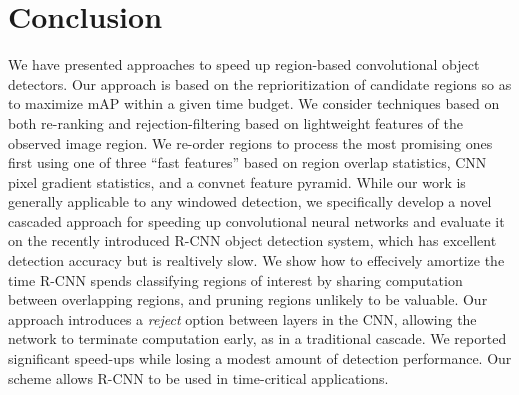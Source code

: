 \section{Conclusion}\label{sec:conclusion}

We have presented approaches to speed up region-based convolutional
object detectors. Our approach is based on the reprioritization of
candidate regions so as to maximize mAP within a given time budget.
We consider techniques based on both re-ranking and
rejection-filtering based on lightweight features of the observed
image region.  We re-order regions to process the most promising ones
first using one of three ``fast features'' based on region overlap
statistics, CNN pixel gradient statistics, and a convnet feature
pyramid.  While our work is generally applicable to any windowed
detection, we specifically develop a novel cascaded approach for
speeding up convolutional neural networks and evaluate it on the
recently introduced R-CNN object detection system, which has excellent
detection accuracy but is realtively slow. We show how to effecively
amortize the time R-CNN spends classifying regions of interest by
sharing computation between overlapping regions, and pruning regions
unlikely to be valuable.  Our approach introduces a \emph{reject}
option between layers in the CNN, allowing the network to terminate
computation early, as in a traditional cascade.  We reported
significant speed-ups while losing a modest amount of detection
performance. Our scheme allows R-CNN to be used in time-critical
applications.

